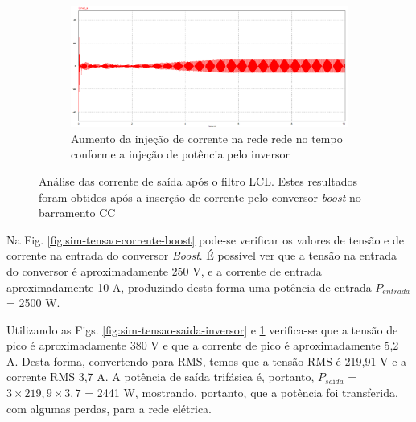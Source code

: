\begin{figure}[!hbt]
	\begin{subfigure}[b]{0.7\textwidth}
		\includegraphics[width=\textwidth]{figuras/sim_figures/inversor_e_boost/injecao_corrente.PNG}
		\caption{Aumento da injeção de corrente na rede rede no tempo conforme a injeção de potência pelo inversor}
	\end{subfigure}
    \caption{Análise das corrente de saída após o filtro LCL. Estes resultados foram obtidos após a inserção de corrente pelo conversor \textit{boost} no barramento CC}
    \label{fig:sim-corrente-saida-inversor}
\end{figure}

Na Fig. \ref{fig:sim-tensao-corrente-boost} pode-se verificar os valores de tensão e de corrente na entrada do conversor \textit{Boost}.
É possível ver que a tensão na entrada do conversor é aproximadamente 250 V, e a corrente de entrada aproximadamente 10 A, produzindo desta forma uma potência de entrada $P_{entrada}$ = 2500 W.

Utilizando as Figs. \ref{fig:sim-tensao-saida-inversor} e \ref{fig:sim-corrente-saida-inversor} verifica-se que a tensão de pico é aproximadamente 380 V e que a corrente de pico é aproximadamente 5,2 A.
Desta forma, convertendo para RMS, temos que a tensão RMS é 219,91 V e a corrente RMS 3,7 A. A potência de saída trifásica é, portanto, $P_{saída}$ = $ 3 \times 219,9 \times 3,7$ = 2441 W, mostrando, portanto, que a potência foi transferida, com algumas perdas, para a rede elétrica.

